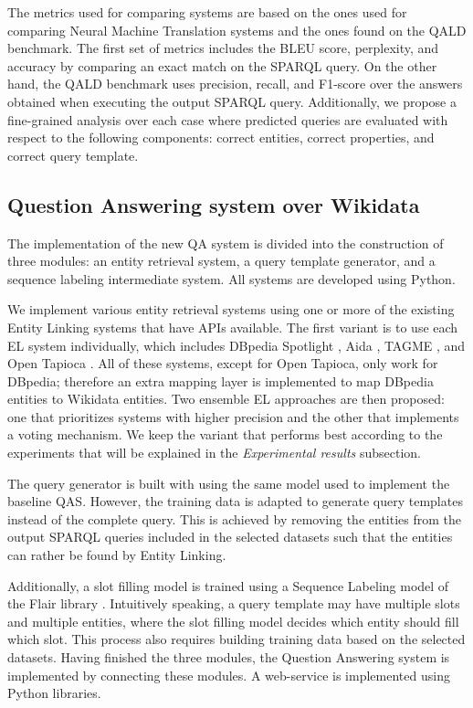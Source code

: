 The metrics used for comparing systems are based on the ones used for comparing Neural 
Machine Translation systems and the ones found on the QALD benchmark. The first set of 
metrics includes the BLEU score, perplexity, and accuracy by comparing an exact match on 
the SPARQL query. On the other hand, the QALD benchmark uses precision, recall, and F1-score 
over the answers obtained when executing the output SPARQL query. Additionally, 
we propose a fine-grained analysis over each case where predicted queries are evaluated with 
respect to the following components: correct entities, correct properties, and correct query 
template.

\subsection*{Question Answering system over Wikidata}
The implementation of the new QA system is divided into the construction of three modules: 
an entity retrieval system, a query template generator, and a sequence labeling intermediate 
system. All systems are developed using Python.

We implement various entity retrieval systems using one or more of the existing Entity 
Linking systems that have APIs available. The first variant is to use each EL system individually, 
which includes DBpedia Spotlight \cite{EL:dbpedia-spotlight-MendesJGB11}, Aida \cite{EL:aida-tool-YosefHBSW11}, 
TAGME \cite{EL:tagme-FerraginaS10}, and Open Tapioca \cite{EL:opentapioca-Delpeuch19}. 
All of these systems, except for Open Tapioca, only work for DBpedia; therefore an 
extra mapping layer is implemented to map DBpedia entities to Wikidata entities. Two ensemble 
EL approaches are then proposed: one that prioritizes systems with higher precision 
and the other that implements a voting mechanism. We keep the variant that performs best 
according to the experiments that will be explained in the \textit{Experimental results} subsection.

The query generator is built with using the same model used to implement the baseline QAS. 
However, the training data is adapted to generate query templates instead of the complete 
query. This is achieved by removing the entities from the output SPARQL queries included 
in the selected datasets such that the entities can rather be found by Entity Linking.

Additionally, a slot filling model is trained using a Sequence Labeling model of the Flair 
library \cite{seqlab:flair-AkbikBBRSV19}. Intuitively speaking, a query template may have 
multiple slots and multiple entities, where the slot filling model decides which entity should fill which slot.
This process also requires building training data based on the selected datasets. 
Having finished the three modules, the Question Answering system is implemented by 
connecting these modules. A web-service is implemented using Python libraries.

